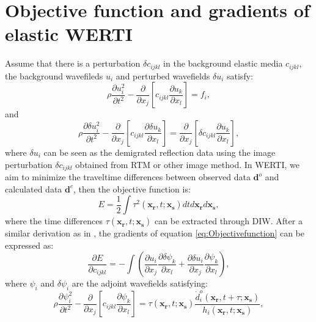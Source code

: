 \section{Objective function and gradients of elastic WERTI}
Assume that there is a perturbation $\delta c_{ijkl}$ in the background elastic media
$c_{ijkl}$, the background wavefileds $u_i$ and perturbed wavefields
$\delta u_i$ satisfy:
\begin{equation}
    \rho \frac{\partial u^2_i}{\partial t^2}  -
    \frac{\partial}{\partial x_j}\left[ 
        c_{ijkl}\frac{\partial u_{k}}{\partial
        x_l}\right]=f_i,
    \label{eq:WE} 
\end{equation}
and
\begin{equation}
    \rho \frac{\partial \delta u^2_i}{\partial t^2}  -
    \frac{\partial}{\partial x_j}\left[ 
        c_{ijkl}\frac{\partial \delta u_{k}}{\partial
        x_l}\right]=\frac{\partial}{\partial x_j}\left[\delta c_{ijkl}\frac{\partial u_{k}}{\partial x_l}\right],
    \label{eq:DeltaWE} 
\end{equation}
where $\delta u_i$ can be seen as the demigrated reflection data using the image
perturbation $\delta c_{ijkl}$ obtained from RTM or other image method. In WERTI, we
aim to minimize the traveltime differences between observed data
$\mathbf{d}^{o}$ and
calculated data $\mathbf{d}^{c}$, then
the objective function is:
\begin{equation}
	E=\frac{1}{2}\int\tau^2(\mathbf{x_r},t;\mathbf{x_s})dtd\mathbf{x_r}d\mathbf{x_s},
    \label{eq:Objectivefunction} 
\end{equation}
where the time differences $\tau(\mathbf{x_r},t;\mathbf{x_s})$ can be extracted
through DIW.
After a similar derivation as in \cite{Ma2013}, the gradients of equation \eqref{eq:Objectivefunction} can be expressed as:
\begin{equation}
	\frac{\partial E}{\partial c_{ijkl}}=-\int (\frac{\partial u_{i}}{\partial
	x_j}\frac{\partial \delta \psi_{k}}{\partial x_l}+\frac{\partial \delta u_{i}}{\partial
	x_j}\frac{\partial \psi_{k}}{\partial x_l}),
    \label{eq:GradientCijkl}
\end{equation}
where $\psi_i$ and $\delta \psi_i$ are the adjoint wavefields satisfying:
\begin{equation}
    \rho \frac{\partial \psi^2_i}{\partial t^2}  -
    \frac{\partial}{\partial x_j}\left[ 
        c_{ijkl}\frac{\partial \psi_{k}}{\partial
		x_l}\right]=\tau(\mathbf{x_r},t;\mathbf{x_s})\frac{\dot{d}^o_i(\mathbf{x_r},t+\tau;\mathbf{x_s})}{h_i(\mathbf{x_r},t;\mathbf{x_s})},
    \label{eq:AdjointWE} 
\end{equation}
